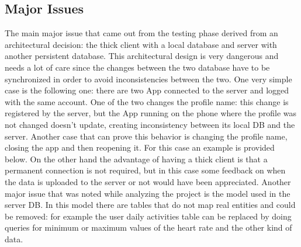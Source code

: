 \subsection{Major Issues}
The main major issue that came out from the testing phase derived from an architectural decision: the thick client with a local database and server with another persistent database. This architectural design is very dangerous and needs a lot of care since the changes between the two database have to be synchronized in order to avoid inconsistencies between the two.
One very simple case is the following one: there are two App connected to the server and logged with the same account. One of the two changes the profile name: this change is registered by the server, but the App running on the phone where the profile was not changed doesn't update, creating inconsistency between its local DB and the server.
Another case that can prove this behavior is changing the profile name, closing the app and then reopening it. For this case an example is provided below.
On the other hand the advantage of having a thick client is that a permanent connection is not required, but in this case some feedback on when the data is uploaded to the server or not would have been appreciated.
Another major issue that was noted while analyzing the project is the model used in the server DB. In this model there are tables that do not map real entities and could be removed: for example the user daily activities table can be replaced by doing queries for minimum or maximum values of the heart rate and the other kind of data.


